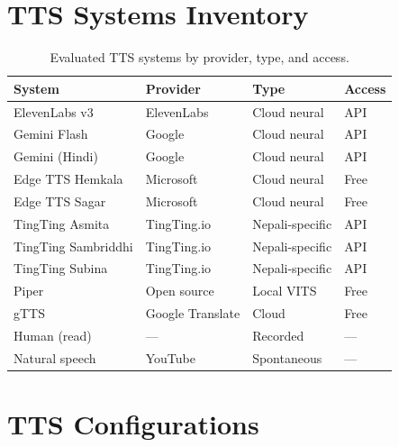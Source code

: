 \documentclass[11pt]{article}
\begin{document}
\section{TTS Systems Inventory}
\label{appx:systems}

\begin{table}[h]
\centering
\caption{Evaluated TTS systems by provider, type, and access.}
\begin{tabular}{llll}
\toprule
System & Provider & Type & Access \\
\midrule
ElevenLabs v3 & ElevenLabs & Cloud neural & API \\
Gemini Flash & Google & Cloud neural & API \\
Gemini (Hindi) & Google & Cloud neural & API \\
Edge TTS Hemkala & Microsoft & Cloud neural & Free \\
Edge TTS Sagar & Microsoft & Cloud neural & Free \\
TingTing Asmita & TingTing.io & Nepali-specific & API \\
TingTing Sambriddhi & TingTing.io & Nepali-specific & API \\
TingTing Subina & TingTing.io & Nepali-specific & API \\
Piper & Open source & Local VITS & Free \\
gTTS & Google Translate & Cloud & Free \\
\midrule
Human (read) & --- & Recorded & --- \\
Natural speech & YouTube & Spontaneous & --- \\
\bottomrule
\end{tabular}
\end{table}

\section{TTS Configurations}
\label{appx:configs}
\end{document}

